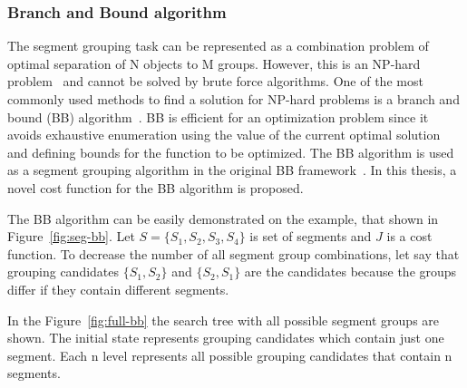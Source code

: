 \documentclass{lutmscthesis}[2010/09/22]
\begin{document}
\subsubsection{Branch and Bound algorithm}
The segment grouping task can be represented as a combination problem of optimal separation of N objects to M groups. However, this is an NP-hard problem~\cite{bubble} and cannot be solved by brute force algorithms. One of the most commonly used methods to find a solution for NP-hard problems is a branch and bound (BB) algorithm~\cite{bubble}.  BB is efficient for an optimization problem since it avoids exhaustive enumeration using the value of the current optimal solution
and defining bounds for the function to be optimized. The BB algorithm is used as a segment grouping algorithm in the original BB framework~\cite{zafari-bb}. In this thesis, a novel cost function for the BB algorithm is proposed.

The BB algorithm can be easily demonstrated on the example, that shown in Figure~\ref{fig:seg-bb}. Let $S=\{S_1,S_2,S_3,S_4\}$ is set of segments and $J$ is a cost function. To decrease the number of all segment group combinations, let say that grouping candidates $\{S_1,S_2\}$ and $\{S_2,S_1\}$ are the candidates because the groups differ if they contain different segments. 


\begin{figure}[htp]
\end{figure}

In the Figure~\ref{fig:full-bb} the search tree with all possible segment groups are shown.  The initial state represents grouping candidates which contain just one segment. Each n level represents all possible grouping candidates that contain n segments.   
\end{document}
